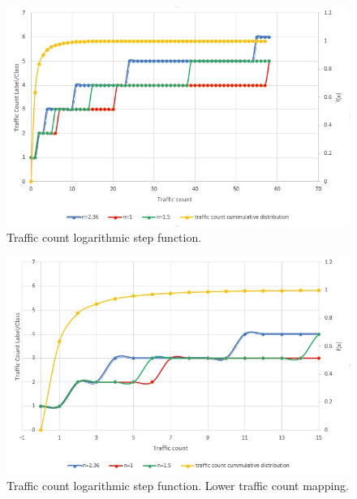 \documentclass[12pt, a4paper]{report}
\theoremstyle{definition}
\theoremstyle{definition}%
\theoremstyle{definition}%
\theoremstyle{definition}%
\theoremstyle{definition}%
\theoremstyle{definition}%
\begin{document}
 
\begin{figure}[h]	
	\includegraphics[scale=0.50]{steps_function.jpg}
	\centering
	\caption{Traffic count logarithmic step function. }
	\label{fig:label_classification_of_traffic_count}
\end{figure}

\begin{figure}[h]	
	\includegraphics[scale=0.50]{steps_function_zoom_in.jpg}
	\centering
	\caption{Traffic count logarithmic step function. Lower traffic count mapping. }
	\label{fig:label_classification_of_traffic_count_zoom_in}
\end{figure}


   

 



\end{document}
